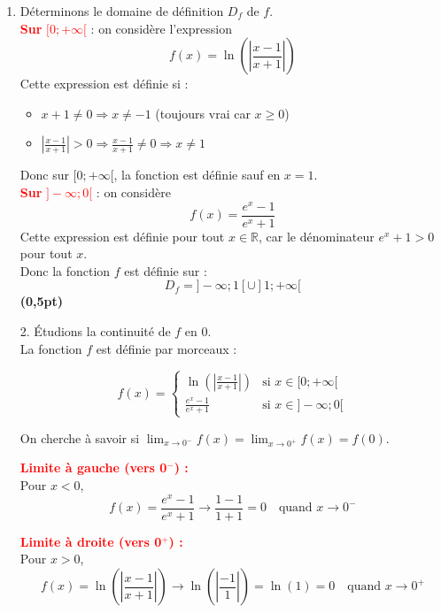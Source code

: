 \documentclass[12pt]{article}
\begin{document}
\begin{enumerate}
    \item Déterminons le domaine de définition \( D_f \) de \( f \).\\

    \textcolor{red}{\textbf{Sur } \( [0 ; +\infty[ \)} : on considère l’expression
    \[
    f(x) = \ln\left( \left| \frac{x - 1}{x + 1} \right| \right)
    \]
    Cette expression est définie si :
    \begin{itemize}
        \item \( x + 1 \neq 0 \Rightarrow x \neq -1 \) (toujours vrai car \( x \geq 0 \))
        \item \( \left| \frac{x - 1}{x + 1} \right| > 0 \Rightarrow \frac{x - 1}{x + 1} \neq 0 \Rightarrow x \neq 1 \)
    \end{itemize}
    Donc sur \( [0 ; +\infty[ \), la fonction est définie sauf en \( x = 1 \).\\

    \textcolor{red}{\textbf{Sur } \( ]-\infty ; 0[ \)} : on considère
    \[
    f(x) = \frac{e^x - 1}{e^x + 1}
    \]
    Cette expression est définie pour tout \( x \in \mathbb{R} \), car le dénominateur \( e^x + 1 > 0 \) pour tout \( x \).\\

    Donc la fonction \( f \) est définie sur :
    \[
    D_f = ]-\infty ; 1[ \cup ]1 ; +\infty[
    \]
    \hfill \textbf{(0,5pt)}
    
    \item[2.] Étudions la continuité de \( f \) en 0.\\

La fonction \( f \) est définie par morceaux :

\[
f(x) =
\begin{cases}
\ln\left( \left| \frac{x - 1}{x + 1} \right| \right) & \text{si } x \in [0 ; +\infty[ \\
\frac{e^x - 1}{e^x + 1} & \text{si } x \in ]-\infty ; 0[
\end{cases}
\]

On cherche à savoir si \( \displaystyle \lim_{x \to 0^-} f(x) = \lim_{x \to 0^+} f(x) = f(0) \).

\textcolor{red}{\textbf{Limite à gauche (vers 0\(^-\)) :}}\\
Pour \( x < 0 \),
\[
f(x) = \frac{e^x - 1}{e^x + 1} \to \frac{1 - 1}{1 + 1} = 0 \quad \text{quand } x \to 0^-
\]

\textcolor{red}{\textbf{Limite à droite (vers 0\(^+\)) :}}\\
Pour \( x > 0 \),
\[
f(x) = \ln\left( \left| \frac{x - 1}{x + 1} \right| \right)
\to \ln\left( \left| \frac{-1}{1} \right| \right) = \ln(1) = 0 \quad \text{quand } x \to 0^+
\]


\end{enumerate}
\end{document}
